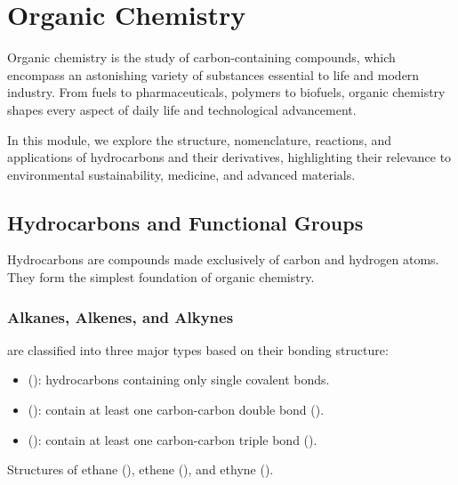 \chapter{Organic Chemistry}

Organic chemistry is the study of carbon-containing compounds, which encompass an astonishing variety of substances essential to life and modern industry. From fuels to pharmaceuticals, polymers to biofuels, organic chemistry shapes every aspect of daily life and technological advancement. 


In this module, we explore the structure, nomenclature, reactions, and applications of hydrocarbons and their derivatives, highlighting their relevance to environmental sustainability, medicine, and advanced materials.

\section{Hydrocarbons and Functional Groups}
\FloatBarrier
\FloatBarrier
\FloatBarrier

Hydrocarbons are compounds made exclusively of carbon and hydrogen atoms. They form the simplest foundation of organic chemistry.

\subsection{Alkanes, Alkenes, and Alkynes}
\FloatBarrier
\FloatBarrier
\FloatBarrier

 are classified into three major types based on their bonding structure:

\begin{itemize}
    \item {} (): hydrocarbons containing only single covalent bonds.
    \item {} (): contain at least one carbon-carbon double bond ().
    \item {} (): contain at least one carbon-carbon triple bond ().
\end{itemize}

\begin{marginfigure}[0pt][0pt][0pt]
    \caption{Structures of ethane (), ethene (), and ethyne ().}
\end{marginfigure}

